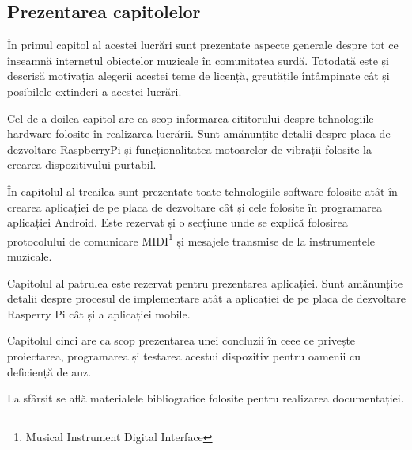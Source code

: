 \documentclass[../IoMusT.tex]{subfiles}
\begin{document}
\subsection{Prezentarea capitolelor}
În primul capitol al acestei lucrări sunt prezentate aspecte generale des\-pre tot ce înseamnă internetul obiectelor muzicale în comunitatea surdă. Tot\-o\-da\-tă este și descrisă motivația alegerii acestei teme de licență, greutățile întâmpinate cât și posibilele extinderi a acestei lucrări.
\\
\par Cel de a doilea capitol are ca scop informarea cititorului despre tehnologiile hardware folosite în realizarea lucrării. Sunt amănunțite detalii despre placa de dezvoltare RaspberryPi și funcționalitatea motoarelor de vibrații folosite la crearea dispozitivului purtabil.
\\
\par În capitolul al treailea sunt prezentate toate tehnologiile software folosite atât în crearea aplicației de pe placa de dezvoltare cât și cele folosite în programarea aplicației Android. Este rezervat și o secțiune unde se explică folosirea protocolului de comunicare MIDI\footnote{Musical Instrument Digital Interface} și mesajele transmise de la instrumentele muzicale.
\\
\par Capitolul al patrulea este rezervat pentru prezentarea aplicației. Sunt amănunțite detalii despre procesul de implementare atât a aplicației de pe placa de dezvoltare Rasperry Pi cât și a aplicației mobile.
\\
\par Capitolul cinci are ca scop prezentarea unei concluzii în ceee ce privește proiectarea, programarea și testarea acestui dispozitiv pentru oamenii cu deficiență de auz.
\\
\par La sfârșit se află materialele bibliografice folosite pentru realizarea do\-cu\-men\-ta\-ți\-ei.
\end{document}
